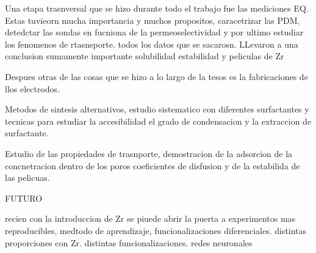 Una etapa trasnversal que se hizo durante todo el trabajo fue las mediciones EQ. Estas tuvieorn mucha importancia y muchos propositos, caracetrizar las PDM, detedctar las sondas en fucniona de la permeoselectividad y por ultimo estudiar los fenomenos de rtasnsporte.
todos los datos que se sacarosn. LLevaron a una conclusion sumamente importante solubilidad estabilidad y peliculas de Zr

Despues otras de las cosas que se hizo a lo largo de la tesos es la fabricaciones de llos electrodos.


Metodos de sintesis alternativos, estudio sistematico con diferentes surfactantes y tecnicas para estudiar la accesibilidad el grado de condensacion y la extraccion de surfactante.

Estudio de las propiedades de trasnporte, demostracion de la adsorcion de la concnetracion dentro de los poros coeficientes de disfusion y de la estabilida de las pelicuas.



FUTURO

recien con la introduccion de Zr se piuede abrir la puerta a experimentos mas reproducibles, medtodo de aprendizaje, funcionalizaciones diferenciales. distintas proporciones con Zr. distintas funcionalizaciones.
redes neuronales

\newpage

